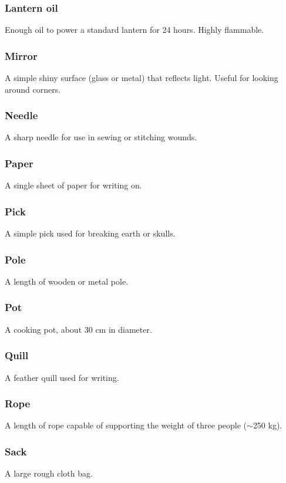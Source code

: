 \documentclass[a4paper,11pt,oneside]{book}
\begin{document}
\subsubsection*{Lantern oil}
Enough oil to power a standard lantern for 24 hours. Highly flammable.

\subsubsection*{Mirror}
A simple shiny surface (glass or metal) that reflects light. Useful for looking around corners.

\subsubsection*{Needle}
A sharp needle for use in sewing or stitching wounds.

\subsubsection*{Paper}
A single sheet of paper for writing on.

\subsubsection*{Pick}
A simple pick used for breaking earth or skulls.

\subsubsection*{Pole}
A length of wooden or metal pole.

\subsubsection*{Pot}
A cooking pot, about 30 cm in diameter.

\subsubsection*{Quill}
A feather quill used for writing.

\subsubsection*{Rope}
A length of rope capable of supporting the weight of three people ($\sim$250 kg).

\subsubsection*{Sack}
A large rough cloth bag.
\end{document}
